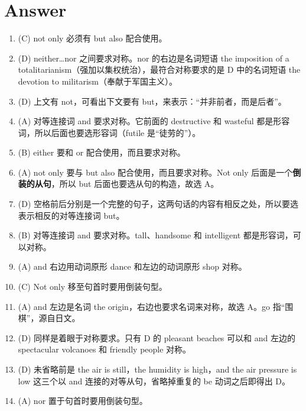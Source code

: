 \section{Answer}
\begin{enumerate}
\item (C) not only 必须有 but also 配合使用。

\item (D) neither…nor 之间要求对称。nor 的右边是名词短语 the imposition of a totalitarianism（强加以集权统治），最符合对称要求的是 D 中的名词短语 the devotion to militarism（奉献于军国主义）。

\item (D) 上文有 not，可看出下文要有 but，来表示：“并非前者，而是后者”。

\item (A) 对等连接词 and 要求对称。它前面的 destructive 和 wasteful 都是形容词，所以后面也要选形容词（futile 是“徒劳的”）。

\item  (B) either 要和 or 配合使用，而且要求对称。

\item (A) not only 要与 but also 配合使用，而且要求对称。Not only 后面是一个\textbf{倒装的从句}，所以 but 后面也要选从句的构造，故选 A。
\item  (D) 空格前后分别是一个完整的句子，这两句话的内容有相反之处，所以要选表示相反的对等连接词 but。

\item (B) 对等连接词 and 要求对称。tall、handsome 和 intelligent 都是形容词，可以对称。


\item (A) and 右边用动词原形 dance 和左边的动词原形 shop 对称。

\item (C) Not only 移至句首时要用倒装句型。
\item  (A) and 左边是名词 the origin，右边也要求名词来对称，故选 A。go 指“围棋”，源自日文。

\item (D) 同样是着眼于对称要求。只有 D 的 pleasant beaches 可以和 and 左边的 spectacular volcanoes 和 friendly people 对称。

\item (D) 未省略前是 the air is still，the humidity is high，and the air pressure is low 这三个以 and 连接的对等从句，省略掉重复的 be 动词之后即得出 D。

\item(A) nor 置于句首时要用倒装句型。


\end{enumerate}
